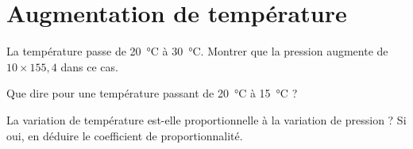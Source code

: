 \documentclass{article}
\begin{document}
\section{Augmentation de température}
\begin{alphaquestions}
\item La température passe de \qty{20}{\celsius} à \qty{30}{\celsius}. Montrer que la pression augmente de $10 \times 155,4$ dans ce cas.
\item Que dire pour une température passant de \qty{20}{\celsius} à \qty{15}{\celsius} ?
\item La variation de température est-elle proportionnelle à la variation de pression ? Si oui, en déduire le coefficient de proportionnalité.
\end{alphaquestions}
\end{document}
